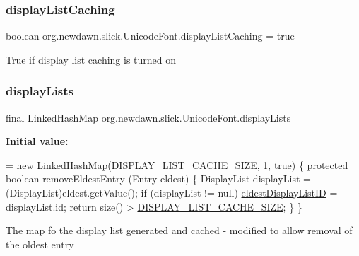 \subsubsection{\texorpdfstring{display\+List\+Caching}{displayListCaching}}
{\footnotesize\ttfamily boolean org.\+newdawn.\+slick.\+Unicode\+Font.\+display\+List\+Caching = true\hspace{0.3cm}{\ttfamily [private]}}

True if display list caching is turned on \mbox{\label{classorg_1_1newdawn_1_1slick_1_1_unicode_font_a66750034039374bef370150798d64f95}} 
\subsubsection{\texorpdfstring{display\+Lists}{displayLists}}
{\footnotesize\ttfamily final Linked\+Hash\+Map org.\+newdawn.\+slick.\+Unicode\+Font.\+display\+Lists\hspace{0.3cm}{\ttfamily [private]}}

{\bfseries Initial value\+:}
\begin{DoxyCode}
= \textcolor{keyword}{new} LinkedHashMap(\mbox{\hyperlink{classorg_1_1newdawn_1_1slick_1_1_unicode_font_ad52862349941296468fcaa685f49f8a4}{DISPLAY\_LIST\_CACHE\_SIZE}}, 1, \textcolor{keyword}{true}) \{
        \textcolor{keyword}{protected} \textcolor{keywordtype}{boolean} removeEldestEntry (Entry eldest) \{
            DisplayList displayList = (DisplayList)eldest.getValue();
            \textcolor{keywordflow}{if} (displayList != null) \mbox{\hyperlink{classorg_1_1newdawn_1_1slick_1_1_unicode_font_a093f0c7469fcdddf31407ca64a9beacd}{eldestDisplayListID}} = displayList.id;
            \textcolor{keywordflow}{return} size() > \mbox{\hyperlink{classorg_1_1newdawn_1_1slick_1_1_unicode_font_ad52862349941296468fcaa685f49f8a4}{DISPLAY\_LIST\_CACHE\_SIZE}};
        \}
    \}
\end{DoxyCode}
The map fo the display list generated and cached -\/ modified to allow removal of the oldest entry \mbox{\label{classorg_1_1newdawn_1_1slick_1_1_unicode_font_a57bc565e86127d8f7c0d7bcfa2f6dc56}} 
